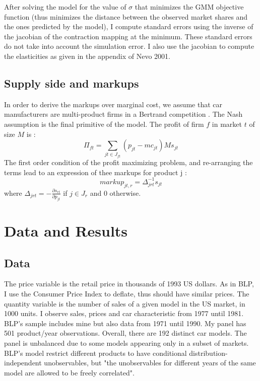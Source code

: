 \documentclass{article}\usepackage[]{graphicx}\usepackage[]{color}
\begin{document}
After solving the model for the value of $\sigma$ that minimizes the GMM objective function (thus minimizes the distance between the observed market shares and the ones predicted by the model), I compute standard errors using the inverse of the jacobian of the contraction mapping at the minimum. These standard errors do not take into account the simulation error. I also use the jacobian to compute the elasticities as given in the appendix of Nevo 2001.


\subsection{Supply side and markups}
In order to derive the markups over marginal cost, we assume that car manufacturers are multi-product firms in a Bertrand competition . The Nash assumption is the final primitive of the model. The profit of firm $f$ in market $t$ of size $M$ is : 
\begin{equation}
\Pi_{ft} = \sum\limits_{jt \in J_{ft}} (p_{jt} - mc_{jt}) M s_{jt}
\label{eq:profits}
\end{equation}
The first order condition of the profit maximizing problem, and re-arranging the terms lead to an expression of thee markups for product j : 
\begin{equation}
markup_{jt,r} = \Delta_{jrt}^{-1} s_{jt}
\label{eq:markup}
\end{equation}
where $\Delta_{jrt} = - \frac{\partial s_{rt}}{\partial p_{jt}}$ if $j \in J_r$ and 0 otherwise.
%



\section{Data and Results}

\subsection{Data}

The price variable is the retail price in thousands of 1993 US dollars. As in BLP, I use the Consumer Price Index to deflate, thus should have similar prices. The quantity variable is the number of sales of a given model in the US market, in 1000 units. I observe sales, prices and car characteristic from 1977 until 1981. BLP's sample includes mine but also data from 1971 until 1990. My panel has 501 product/year observations.  Overall, there are 192 distinct car models. The panel is unbalanced due to some models appearing only in a subset of markets. BLP's model restrict different products to have conditional distribution-independent unobservables, but "the unobservables for different years of the same model are allowed to be freely correlated". 
\end{document}
